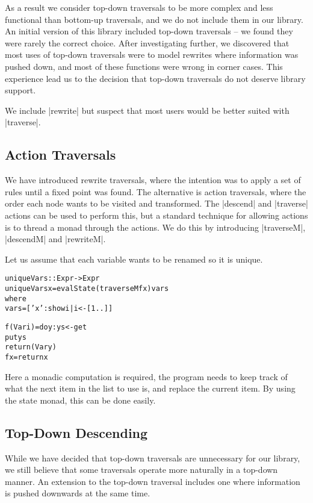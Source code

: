 \documentclass[preprint]{sigplanconf}
\newenvironment{code}{\begin{alltt}\small}{\end{alltt}}
\begin{document}
As a result we consider top-down traversals to be more complex and less functional than bottom-up traversals, and we do not include them in our library. An initial version of this library included top-down traversals -- we found they were rarely the correct choice. After investigating further, we discovered that most uses of top-down traversals were to model rewrites where information was pushed down, and most of these functions were wrong in corner cases. This experience lead us to the decision that top-down traversals do not deserve library support.

We include |rewrite| but suspect that most users would be better suited with |traverse|.


\subsection{Action Traversals}

We have introduced rewrite traversals, where the intention was to apply a set of rules until a fixed point was found. The alternative is action traversals, where the order each node wants to be visited and transformed. The |descend| and |traverse| actions can be used to perform this, but a standard technique for allowing actions is to thread a monad through the actions. We do this by introducing |traverseM|, |descendM| and |rewriteM|.

Let us assume that each variable wants to be renamed so it is unique.

\begin{code}
uniqueVars :: Expr -> Expr
uniqueVars x = evalState (traverseM f x) vars
    where
        vars = ['x':show i | i <- [1..]]
    
        f (Var i)  = do  y:ys <- get
                         put ys
                         return (Var y)
        f x        = return x
\end{code}

Here a monadic computation is required, the program needs to keep track of what the next item in the list to use is, and replace the current item. By using the state monad, this can be done easily.


\subsection{Top-Down Descending}

While we have decided that top-down traversals are unnecessary for our library, we still believe that some traversals operate more naturally in a top-down manner. An extension to the top-down traversal includes one where information is pushed downwards at the same time.
\end{document}
